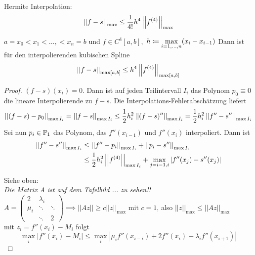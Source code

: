 \documentclass[../Skript.tex]{subfiles}
\begin{document}
\begin{question}\hfill\\
    \begin{reminder} Hermite Interpolation:\[
        \left\vert\left\vert f-s\right\vert\right\vert_{\max}\leq \frac{1}{4!}h^4\left\vert\left\vert f^{(4)}\right\vert\right\vert_{\max}\]    
    \end{reminder}
\end{question}
\begin{theorem}
    $a = x_0 < x_1 < \dots, < x_n = b$ und $f\in C^4[a,b],$ $h\coloneqq \max\limits_{\igb{i}{1}{n}}(x_i - x_{i-1})$
    Dann ist für den interpolierenden kubischen Spline \[
        \left\vert\left\vert f-s\right\vert\right\vert_{\max[a,b]} \leq h^4\left\vert\left\vert f^{(4)}\right\vert\right\vert_{\max[a,b]}\]
\end{theorem}
\begin{proof}
    $(f-s)(x_i) = 0$. Dann ist auf jeden Teilintervall $I_i$ das Polynom $p_0\equiv0$ die lineare Interpolierende
    zu $f-s$. Die Interpolations-Fehlerabschätzung liefert\[
        \left\vert\left\vert(f-s) - p_0\right\vert\right\vert_{\max I_i} = \left\vert\left\vert f-s\right\vert\right\vert_{\max I_i} \leq \frac{1}{2}h_i^2\left\vert\left\vert(f-s)''\right\vert\right\vert_{\max I_i} = \frac{1}
        {2}h_i^2\left\vert\left\vert f''-s''\right\vert\right\vert_{\max I_i}\]
    Sei nun $p_i\in \mathbb{P}_1$ das Polynom, das $f''(x_{i-1})$ und $f''(x_i)$ interpoliert. Dann ist \begin{align*}
        \left\vert\left\vert f'' - s''\right\vert\right\vert_{\max I_i} &\leq \left\vert\left\vert f'' - p_i\right\vert\right\vert_{\max I_i} + \left\vert\left\vert p_i - s''\right\vert\right\vert_{\max I_i}\\
                                    &\leq \frac{1}{2}h_i^2\left\vert\left\vert f^{(4)}\right\vert\right\vert_{\max I_i} + \max\limits_{j = i-1, i}\left\vert f''(x_j) 
                                    - s''(x_j) \right\vert
    \end{align*}

Siehe oben: 
\\
\textit{Die Matrix A ist auf dem Tafelbild ... zu sehen!!} \frownie 
\\
\(
A=\begin{pmatrix}
    2 & \lambda_i & \ \\
    \mu_i & \ddots & \ddots \\
    \ & \ddots & 2
\end{pmatrix} \implies ||Az|| \geq c||z||_{\text{max}} \) mit \(c=1\), also \(||z||_{\text{max}}\leq||Az||_{\text{max}}\)\\
mit \(z_i= f''(x_i)-M_i\) folgt \[\max\limits_{i}|f''(x_i)-M_i|\leq \max\limits_{i}|\mu_if''(x_{i-i})+2f''(x_i)+
\lambda_if''(x_{i+1})|\]
\end{proof}

\end{document}
